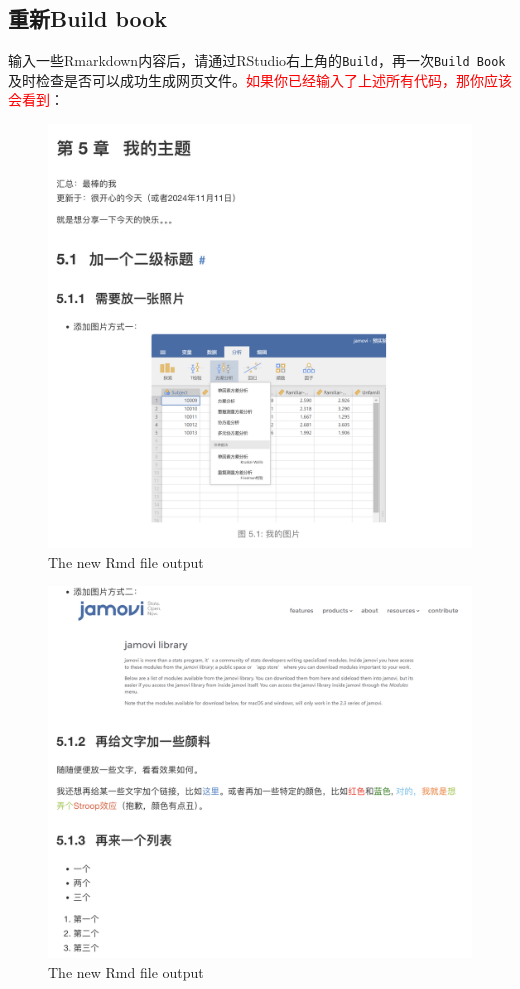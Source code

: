 \documentclass[]{ctexbook}
\theoremstyle{definition}
\theoremstyle{definition}
\theoremstyle{definition}
\theoremstyle{definition}
\theoremstyle{remark}
\begin{document}
\subsection{重新Build book}\label{ux91cdux65b0build-book}

输入一些Rmarkdown内容后，请通过RStudio右上角的\texttt{Build}，再一次\texttt{Build\ Book}及时检查是否可以成功生成网页文件。\textcolor{red}{如果你已经输入了上述所有代码，那你应该会看到}：

\begin{figure}

{\centering \includegraphics[width=0.8\linewidth]{img/contribute/new_rmd_output1} 

}

\caption{The new Rmd file output}\label{fig:contri-new-rmd-1}
\end{figure}
\begin{figure}

{\centering \includegraphics[width=0.8\linewidth]{img/contribute/new_rmd_output2} 

}

\caption{The new Rmd file output}\label{fig:contri-new-rmd-2}
\end{figure}
\end{document}
